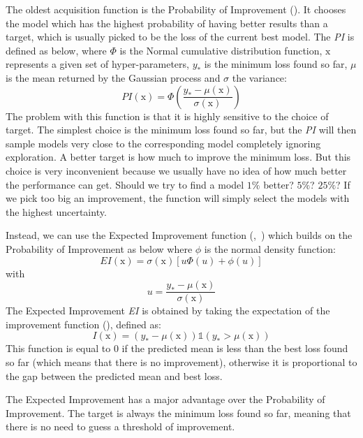 The oldest acquisition function is the Probability of Improvement (\textcite{kushner1964}). It chooses the model which has the highest probability of having better results than a target, which is usually picked to be the loss of the current best model. The \textit{PI} is defined as below, where $\Phi$ is the Normal cumulative distribution function, $\mathrm{x}$ represents a given set of hyper-parameters, $y_*$ is the minimum loss found so far, $\mu$ is the mean returned by the Gaussian process and $\sigma$ the variance:
\begin{equation}
    PI(\mathrm{x}) = \Phi \left( \frac{y_* - \mu(\mathrm{x})}{\sigma(\mathrm{x})}\right)
\end{equation}
The problem with this function is that it is highly sensitive to the choice of target. The simplest choice is the minimum loss found so far, but the \textit{PI} will then sample models very close to the corresponding model completely ignoring exploration. A better target is how much to improve the minimum loss. But this choice is very inconvenient because we usually have no idea of how much better the performance can get. Should we try to find a model $1 \%$ better? $5 \%$? $25 \%$? If we pick too big an improvement, the function will simply select the models with the highest uncertainty.

Instead, we can use the Expected Improvement function (\textcite{schonlau1998},~\textcite{jones2001}) which builds on the Probability of Improvement as below where $\phi$ is the normal density function:
\begin{equation}
	EI(\mathrm{x})  = \sigma (\mathrm{x}) [u\Phi(u)+\phi(u)]
\end{equation}
with
\begin{equation}
	u = \frac{y_* - \mu(\mathrm{x})}{\sigma(\mathrm{x})}
\end{equation}
The Expected Improvement \textit{EI} is obtained by taking the expectation of the improvement function (\textcite{shahriari2016IEEE}), defined as:
\begin{equation}
	I(\mathrm{x}) = \left(y_* - \mu(\mathrm{x}) \right) \mathds{1} \left(y_* > \mu(\mathrm{x}) \right)
\end{equation}
This function is equal to $0$ if the predicted mean is less than the best loss found so far (which means that there is no improvement), otherwise it is proportional to the gap between the predicted mean and best loss. 

The Expected Improvement has a major advantage over the Probability of Improvement. The target is always the minimum loss found so far, meaning that there is no need to guess a threshold of improvement. 

